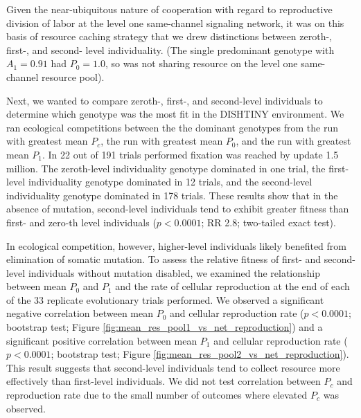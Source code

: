Given the near-ubiquitous nature of cooperation with regard to reproductive division of labor at the level one same-channel signaling network, it was on this basis of resource caching strategy that we drew distinctions between zeroth-, first-, and second- level individuality.
(The single predominant genotype with $A_1 = 0.91$ had $P_0 = 1.0$, so was not sharing resource on the level one same-channel resource pool).

Next, we wanted to compare zeroth-, first-, and second-level individuals to determine which genotype was the most fit in the DISHTINY environment.
We ran ecological competitions between the the dominant genotypes from the run with greatest mean $P_{c}$, the run with greatest mean $P_0$, and the run with greatest mean $P_1$.
In 22 out of 191 trials performed fixation was reached by update 1.5 million.  The zeroth-level individuality genotype dominated in one trial, the first-level individuality genotype dominated in 12 trials, and the second-level individuality genotype dominated in 178 trials.
These results show that in the absence of mutation, second-level individuals tend to exhibit greater fitness than first- and zero-th level individuals ($p < 0.0001$; RR 2.8; two-tailed exact test).

In ecological competition, however, higher-level individuals likely benefited from elimination of somatic mutation.
To assess the relative fitness of first- and second-level individuals without mutation disabled, we examined the relationship between mean $P_0$ and $P_1$ and the rate of cellular reproduction at the end of each of the 33 replicate evolutionary trials performed.
We observed a significant negative correlation between mean $P_0$ and cellular reproduction rate ($p < 0.0001$; bootstrap test; Figure \ref{fig:mean_res_pool1_vs_net_reproduction}) and a significant positive correlation between mean $P_1$ and cellular reproduction rate ($p < 0.0001$; bootstrap test; Figure \ref{fig:mean_res_pool2_vs_net_reproduction}).
This result suggests that second-level individuals tend to collect resource more effectively than first-level individuals.
We did not test correlation between $P_{c}$ and reproduction rate due to the small number of outcomes where elevated $P_{c}$ was observed.

